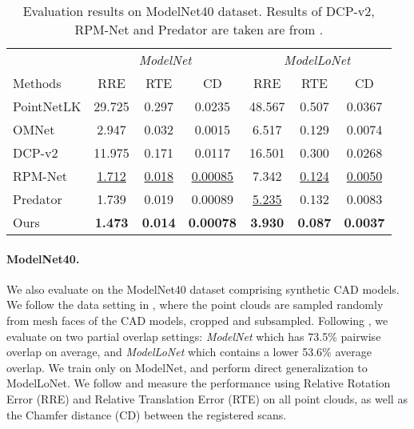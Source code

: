 \documentclass[10pt,twocolumn,letterpaper]{article}
\begin{document}
\begin{table}
\footnotesize
\centering
\setlength\tabcolsep{3.5pt}
\begin{tabularx}{\linewidth}{X | c c c | c c c}
  \hline
  & \multicolumn{3}{c|}{\emph{ModelNet}} & \multicolumn{3}{c}{\emph{ModelLoNet}} \\
  Methods & RRE & RTE & CD & RRE & RTE & CD \\
  \hline
  PointNetLK \cite{aoki2019pointnetlk} &
  29.725 & 0.297 & 0.0235 & 48.567 & 0.507 & 0.0367
  \\
  OMNet \cite{xu2021omnet} &
2.947 & 0.032 & 0.0015 & 6.517 & 0.129 & 0.0074  \\
  DCP-v2 \cite{wang2019dcp} 
  & 11.975 & 0.171 & 0.0117 
  & 16.501 & 0.300 & 0.0268
  \\
  RPM-Net \cite{yew2020rpmnet}
  & \underline{1.712} & \underline{0.018} & \underline{0.00085} 
  & 7.342 & \underline{0.124} & \underline{0.0050} 
  \\
  Predator \cite{huang2021predator} 
  & 1.739 & 0.019 & 0.00089
  & \underline{5.235} & 0.132 & 0.0083
  \\
  \hline
  Ours & \textbf{1.473} & \textbf{0.014} & \textbf{0.00078} 
  & \textbf{3.930} & \textbf{0.087} & \textbf{0.0037}\\
  \hline
\end{tabularx}
\vspace{-1mm}
\caption{Evaluation results on ModelNet40 dataset. Results of DCP-v2, RPM-Net and Predator are taken are from \cite{huang2021predator}.}
\label{table:modelnet-performance}
\end{table}

\vspace{-4mm}
\paragraph{ModelNet40.}
We also evaluate on the ModelNet40 \cite{wu2015modelnet} dataset comprising synthetic CAD models. We follow the data setting in \cite{yew2020rpmnet,huang2021predator}, where the point clouds are sampled randomly from mesh faces of the CAD models, cropped and subsampled. Following \cite{huang2021predator}, we evaluate on two partial overlap settings: \emph{ModelNet} which has 73.5\% pairwise overlap on average, and \emph{ModelLoNet} which contains a lower 53.6\% average overlap.  We train only on ModelNet, and perform direct generalization to ModelLoNet.
We follow \cite{yew2020rpmnet,huang2021predator} and measure the performance using Relative Rotation Error (RRE) and Relative Translation Error (RTE) on all point clouds, as well as the Chamfer distance (CD) between the registered scans.
\end{document}
